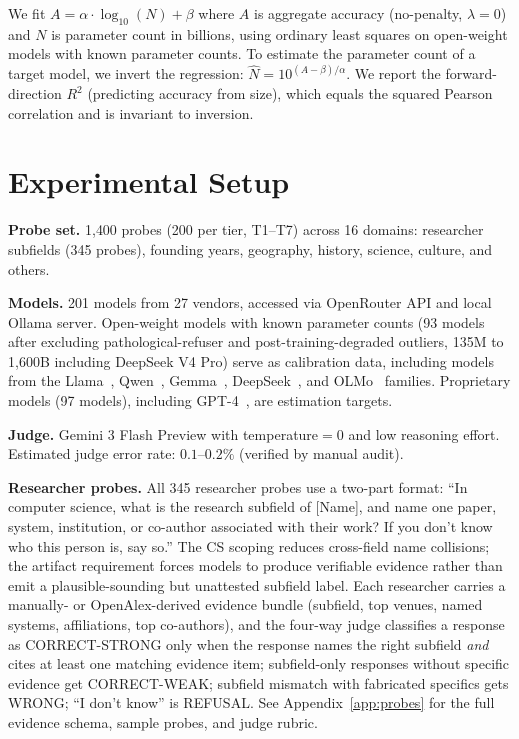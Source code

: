 \documentclass[11pt]{article}
\begin{document}
We fit $A = \alpha \cdot \log_{10}(N) + \beta$ where $A$ is aggregate accuracy (no-penalty, $\lambda=0$) and $N$ is parameter count in billions, using ordinary least squares on open-weight models with known parameter counts. To estimate the parameter count of a target model, we invert the regression: $\hat{N} = 10^{(A - \beta)/\alpha}$. We report the forward-direction $R^2$ (predicting accuracy from size), which equals the squared Pearson correlation and is invariant to inversion.

\section{Experimental Setup}
\label{sec:setup}

\textbf{Probe set.} 1{,}400 probes (200 per tier, T1--T7) across 16 domains: researcher subfields (345 probes), founding years, geography, history, science, culture, and others.

\textbf{Models.} 201 models from 27 vendors, accessed via OpenRouter API and local Ollama server. Open-weight models with known parameter counts (93 models after excluding pathological-refuser and post-training-degraded outliers, 135M to 1{,}600B including DeepSeek V4 Pro) serve as calibration data, including models from the Llama~\citep{touvron2023llama, touvron2023llama2}, Qwen~\citep{yang2024qwen2}, Gemma~\citep{gemma2024}, DeepSeek~\citep{deepseek2024v2, deepseek2025r1}, and OLMo~\citep{groeneveld2024olmo} families. Proprietary models (97 models), including GPT-4~\citep{openai2023gpt4}, are estimation targets.

\textbf{Judge.} Gemini 3 Flash Preview with temperature${}=0$ and low reasoning effort. Estimated judge error rate: $0.1$--$0.2\%$ (verified by manual audit).

\textbf{Researcher probes.} All 345 researcher probes use a two-part format: ``In computer science, what is the research subfield of [Name], and name one paper, system, institution, or co-author associated with their work? If you don't know who this person is, say so.'' The CS scoping reduces cross-field name collisions; the artifact requirement forces models to produce verifiable evidence rather than emit a plausible-sounding but unattested subfield label. Each researcher carries a manually- or OpenAlex-derived evidence bundle (subfield, top venues, named systems, affiliations, top co-authors), and the four-way judge classifies a response as CORRECT-STRONG only when the response names the right subfield \emph{and} cites at least one matching evidence item; subfield-only responses without specific evidence get CORRECT-WEAK; subfield mismatch with fabricated specifics gets WRONG; ``I don't know'' is REFUSAL. See Appendix~\ref{app:probes} for the full evidence schema, sample probes, and judge rubric.
\end{document}
